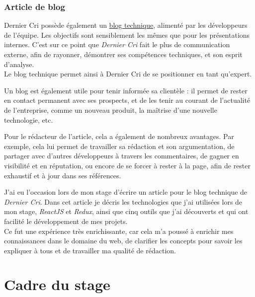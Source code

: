 \documentclass[12pt,a4paper]{article}
\begin{document}
  \bigskip

  \subsubsection{Article de blog}\label{article-de-blog}

  \bigskip

  Dernier Cri possède également un
  \href{http://derniercri.io/tech-blog}{blog technique}, alimenté par les
  développeurs de l'équipe. Les objectifs sont sensiblement les mêmes que
  pour les présentations internes. C'est sur ce point que \emph{Dernier
  Cri} fait le plus de communication externe, afin de rayonner, démontrer
  ses compétences techniques, et son esprit d'analyse.\\
  Le blog technique permet ainsi à Dernier Cri de se positionner en tant
  qu'expert.

  \bigskip

  Un blog est également utile pour tenir informée sa clientèle : il permet
  de rester en contact permanent avec ses prospects, et de les tenir au
  courant de l'actualité de l'entreprise, comme un nouveau produit, la
  maîtrise d'une nouvelle technologie, etc.

  \bigskip

  Pour le rédacteur de l'article, cela a également de nombreux avantages.
  Par exemple, cela lui permet de travailler sa rédaction et son
  argumentation, de partager avec d'autres développeurs à travers les
  commentaires, de gagner en visibilité et en réputation, ou encore de se
  forcer à rester à la page, afin de rester exhaustif et à jour dans ses
  références.

  \bigskip

  J'ai eu l'occasion lors de mon stage d'écrire un article pour le blog
  technique de \emph{Dernier Cri}. Dans cet article je décris les
  technologies que j'ai utilisées lors de mon stage, \emph{ReactJS} et
  \emph{Redux}, ainsi que cinq outils que j'ai découverts et qui ont
  facilité le développement de mes projets.\\
  Ce fut une expérience très enrichissante, car cela m'a poussé à enrichir
  mes connaissances dans le domaine du web, de clarifier les concepts pour
  savoir les expliquer à tous et de travailler ma qualité de rédaction.

  \newpage

  \section{Cadre du stage}\label{cadre-du-stage}
\end{document}
